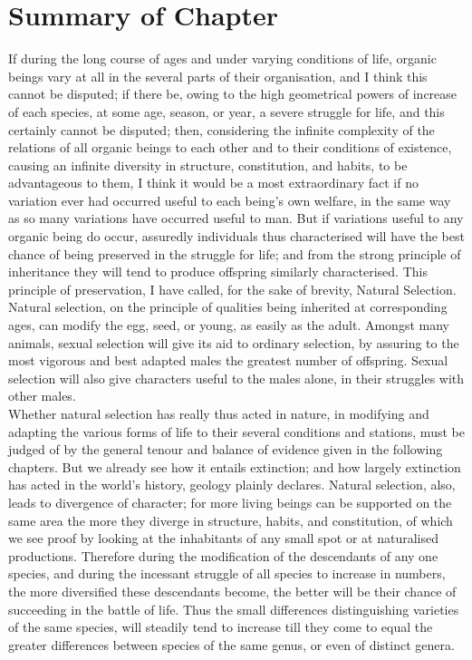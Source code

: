 \section{Summary of Chapter}
\indent If during the long course of ages and under varying conditions of life, organic beings vary at all in the several parts of their organisation, and I think this cannot be disputed; if there be, owing to the high geometrical powers of increase of each species, at some age, season, or year, a severe struggle for life, and this certainly cannot be disputed; then, considering the infinite complexity of the relations of all organic beings to each other and to their conditions of existence, causing an infinite diversity in structure, constitution, and habits, to be advantageous to them, I think it would be a most extraordinary fact if no variation ever had occurred useful to each being's own welfare, in the same way as so many variations have occurred useful to man. But if variations useful to any organic being do occur, assuredly individuals thus characterised will have the best chance of being preserved in the struggle for life; and from the strong principle of inheritance they will tend to produce offspring similarly characterised. This principle of preservation, I have called, for the sake of brevity, Natural Selection. Natural selection, on the principle of qualities being inherited at corresponding ages, can modify the egg, seed, or young, as easily as the adult. Amongst many animals, sexual selection will give its aid to ordinary selection, by assuring to the most vigorous and best adapted males the greatest number of offspring. Sexual selection will also give characters useful to the males alone, in their struggles with other males. \\
\indent Whether natural selection has really thus acted in nature, in modifying and adapting the various forms of life to their several conditions and stations, must be judged of by the general tenour and balance of evidence given in the following chapters. But we already see how it entails extinction; and how largely extinction has acted in the world's history, geology plainly declares. Natural selection, also, leads to divergence of character; for more living beings can be supported on the same area the more they diverge in structure, habits, and constitution, of which we see proof by looking at the inhabitants of any small spot or at naturalised productions. Therefore during the modification of the descendants of any one species, and during the incessant struggle of all species to increase in numbers, the more diversified these descendants become, the better will be their chance of succeeding in the battle of life. Thus the small differences distinguishing varieties of the same species, will steadily tend to increase till they come to equal the greater differences between species of the same genus, or even of distinct genera.\\
